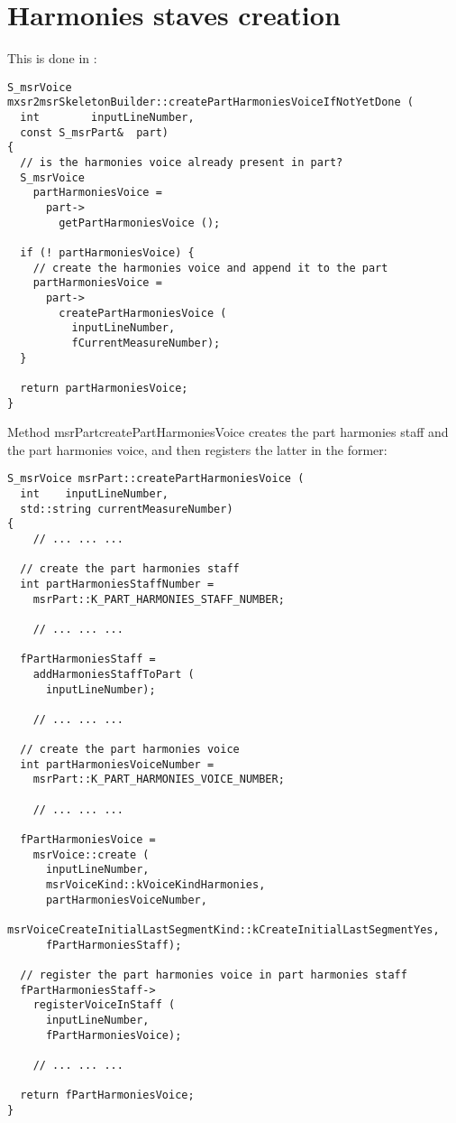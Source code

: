 \section{Harmonies staves creation}

This is done in :
\begin{lstlisting}[language=CPlusPlus]
S_msrVoice mxsr2msrSkeletonBuilder::createPartHarmoniesVoiceIfNotYetDone (
  int        inputLineNumber,
  const S_msrPart&  part)
{
  // is the harmonies voice already present in part?
  S_msrVoice
    partHarmoniesVoice =
      part->
        getPartHarmoniesVoice ();

  if (! partHarmoniesVoice) {
    // create the harmonies voice and append it to the part
    partHarmoniesVoice =
      part->
        createPartHarmoniesVoice (
          inputLineNumber,
          fCurrentMeasureNumber);
  }

  return partHarmoniesVoice;
}
\end{lstlisting}

Method {msrPart}{createPartHarmoniesVoice} creates the part harmonies staff and the part harmonies voice, and then registers the latter in the former:
\begin{lstlisting}[language=CPlusPlus]
S_msrVoice msrPart::createPartHarmoniesVoice (
  int    inputLineNumber,
  std::string currentMeasureNumber)
{
	// ... ... ...

  // create the part harmonies staff
  int partHarmoniesStaffNumber =
    msrPart::K_PART_HARMONIES_STAFF_NUMBER;

	// ... ... ...

  fPartHarmoniesStaff =
    addHarmoniesStaffToPart (
      inputLineNumber);

	// ... ... ...

  // create the part harmonies voice
  int partHarmoniesVoiceNumber =
    msrPart::K_PART_HARMONIES_VOICE_NUMBER;

	// ... ... ...

  fPartHarmoniesVoice =
    msrVoice::create (
      inputLineNumber,
      msrVoiceKind::kVoiceKindHarmonies,
      partHarmoniesVoiceNumber,
      msrVoiceCreateInitialLastSegmentKind::kCreateInitialLastSegmentYes,
      fPartHarmoniesStaff);

  // register the part harmonies voice in part harmonies staff
  fPartHarmoniesStaff->
    registerVoiceInStaff (
      inputLineNumber,
      fPartHarmoniesVoice);

	// ... ... ...

  return fPartHarmoniesVoice;
}
\end{lstlisting}


